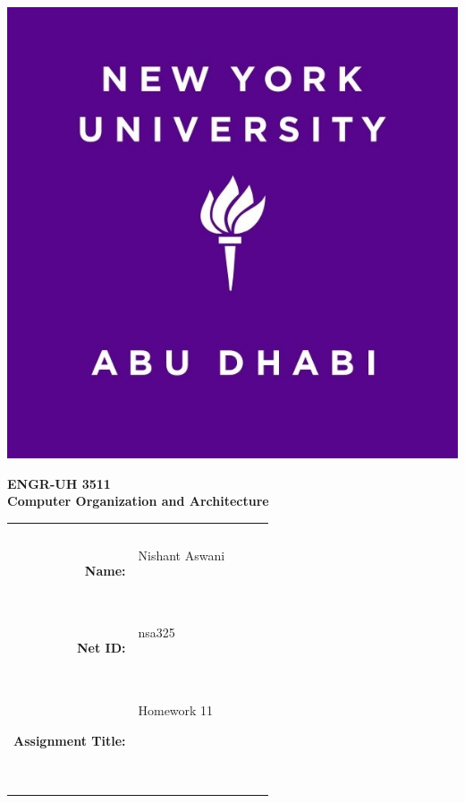 \documentclass[11pt]{exam}
\newcommand{\myname}{Nishant Aswani}
\newcommand{\mynetid}{nsa325}
\newcommand{\myhwtype}{Homework}
\newcommand{\myhwnum}{11}
\newcommand{\mycoursenumber}{ENGR-UH 3511}
\newcommand{\myclassname}{Computer Organization and Architecture}
\begin{document}
\begin{center}
  \includegraphics[scale=0.15]{etc/NYUAD-alt-logo.jpg}
\end{center}

{\vspace{1.5em}}

\begin{center}
    \Huge{\textbf{\mycoursenumber}}\\
    {\vspace{0.5em}}
    \Huge{\textbf{\myclassname}}
\end{center}

{\vspace{10em}}

\begin{center}
  \begin{tabular}{|rp{5.0cm}lll|}
    \hline
    &  &  &  & \\
    &  &  &  & \\
    \Large{\textbf{Name:}} & \Large{\myname}
    
    \  &  &  & \\
    \Large{\textbf{Net ID:}} & \Large{\mynetid}
    
    \  &  &  & \\
    \Large{\textbf{Assignment Title:}} & \Large{\myhwtype{} \myhwnum}
    
    \
    
    \  &  &  & \\
    \hline
  \end{tabular}
\end{center}
\end{document}

